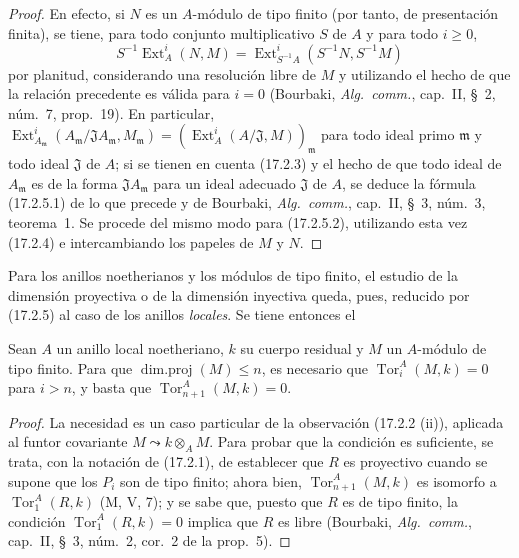 \begin{proof}
En efecto, si $N$ es un $A$-módulo de tipo finito (por tanto, de presentación finita),
se tiene, para todo conjunto multiplicativo $S$ de $A$ y para todo $i\geq0$,
\[
  S^{-1}\operatorname{Ext}^i_A(N,M)
  =\operatorname{Ext}^i_{S^{-1}A}(S^{-1}N,S^{-1}M)
\]
por planitud, considerando una resolución libre de $M$ y utilizando el
hecho de que la relación precedente es válida para $i=0$ (Bourbaki,
\emph{Alg.~comm.}, cap.~II, \S~2, núm.~7, prop.~19). En particular,
$\operatorname{Ext}^i_{A_{\mathfrak{m}}}
(A_{\mathfrak{m}}/\mathfrak{J}A_{\mathfrak{m}},M_{\mathfrak{m}})
=(\operatorname{Ext}^i_A(A/\mathfrak{J},M))_{\mathfrak{m}}$ para todo ideal
primo $\mathfrak{m}$ y todo ideal $\mathfrak{J}$ de $A$; si se tienen
en cuenta (17.2.3) y el hecho de que todo
ideal de $A_{\mathfrak{m}}$ es de la forma $\mathfrak{J}A_{\mathfrak{m}}$
para un ideal adecuado $\mathfrak{J}$ de $A$, se deduce la fórmula
(17.2.5.1) de lo que precede y de Bourbaki, \emph{Alg.~comm.}, cap.~II,
\S~3, núm.~3, teorema~1. Se procede del mismo modo para (17.2.5.2), utilizando esta vez
(17.2.4) e intercambiando los papeles de $M$ y $N$.
\end{proof}

Para los anillos noetherianos y los módulos de tipo finito, el estudio de la
dimensión proyectiva o de la dimensión inyectiva queda, pues, reducido por
(17.2.5) al caso de los anillos \emph{locales}. Se tiene entonces el

\begin{lemma}[17.2.6]
\label{0.17.2.6-fr}
Sean $A$ un anillo local noetheriano, $k$ su cuerpo residual y $M$ un
$A$-módulo de tipo finito. Para que $\operatorname{dim.proj}(M)\leq n$, es
necesario que $\operatorname{Tor}^A_i(M,k)=0$ para $i>n$, y basta que
$\operatorname{Tor}^A_{n+1}(M,k)=0$.
\end{lemma}

\begin{proof}
La necesidad es un caso particular de la observación (17.2.2 (ii)), aplicada al
funtor covariante $M\leadsto k\otimes_A M$. Para probar que la condición es
suficiente, se trata, con la notación de (17.2.1), de establecer que $R$ es
proyectivo cuando se supone que los $P_i$ son de tipo finito; ahora bien,
$\operatorname{Tor}^A_{n+1}(M,k)$ es isomorfo a
$\operatorname{Tor}^A_1(R,k)$ (M, V, 7); y se sabe que, puesto que $R$ es de
tipo finito, la condición $\operatorname{Tor}^A_1(R,k)=0$ implica que $R$ es
libre (Bourbaki, \emph{Alg.~comm.}, cap.~II, \S~3, núm.~2, cor.~2 de la
prop.~5).
\end{proof}

